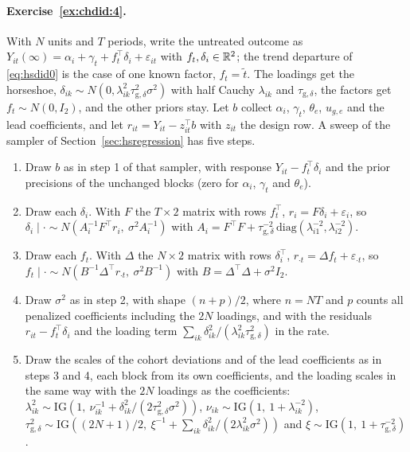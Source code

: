 \paragraph{Exercise~\ref{ex:chdid:4}.} With $N$ units and $T$ periods, write the untreated outcome as $Y_{it}(\infty) = \alpha_i + \gamma_t + f_t^\top\delta_i + \varepsilon_{it}$ with $f_t, \delta_i \in \mathbb{R}^2$; the trend departure of \eqref{eq:hsdid0} is the case of one known factor, $f_t = \tilde t$. The loadings get the horseshoe, $\delta_{ik} \sim N(0, \lambda_{ik}^2\tau_{\mathrm{g},\delta}^2\sigma^2)$ with half Cauchy $\lambda_{ik}$ and $\tau_{\mathrm{g},\delta}$, the factors get $f_t \sim N(0, I_2)$, and the other priors stay. Let $b$ collect $\alpha_i$, $\gamma_t$, $\theta_e$, $u_{g,e}$ and the lead coefficients, and let $r_{it} = Y_{it} - z_{it}^\top b$ with $z_{it}$ the design row. A sweep of the sampler of Section~\ref{sec:hsregression} has five steps.
\begin{enumerate}
\item Draw $b$ as in step 1 of that sampler, with response $Y_{it} - f_t^\top\delta_i$ and the prior precisions of the unchanged blocks (zero for $\alpha_i$, $\gamma_t$ and $\theta_e$).
\item Draw each $\delta_i$. With $F$ the $T \times 2$ matrix with rows $f_t^\top$, $r_i = F\delta_i + \varepsilon_i$, so $\delta_i \mid \cdot \sim N(A_i^{-1}F^\top r_i,\ \sigma^2A_i^{-1})$ with $A_i = F^\top F + \tau_{\mathrm{g},\delta}^{-2}\,\mathrm{diag}(\lambda_{i1}^{-2}, \lambda_{i2}^{-2})$.
\item Draw each $f_t$. With $\Delta$ the $N \times 2$ matrix with rows $\delta_i^\top$, $r_{\cdot t} = \Delta f_t + \varepsilon_{\cdot t}$, so $f_t \mid \cdot \sim N(B^{-1}\Delta^\top r_{\cdot t},\ \sigma^2B^{-1})$ with $B = \Delta^\top\Delta + \sigma^2I_2$.
\item Draw $\sigma^2$ as in step 2, with shape $(n + p)/2$, where $n = NT$ and $p$ counts all penalized coefficients including the $2N$ loadings, and with the residuals $r_{it} - f_t^\top\delta_i$ and the loading term $\sum_{ik}\delta_{ik}^2/(\lambda_{ik}^2\tau_{\mathrm{g},\delta}^2)$ in the rate.
\item Draw the scales of the cohort deviations and of the lead coefficients as in steps 3 and 4, each block from its own coefficients, and the loading scales in the same way with the $2N$ loadings as the coefficients: $\lambda_{ik}^2 \sim \mathrm{IG}(1,\ \nu_{ik}^{-1} + \delta_{ik}^2/(2\tau_{\mathrm{g},\delta}^2\sigma^2))$, $\nu_{ik} \sim \mathrm{IG}(1,\ 1 + \lambda_{ik}^{-2})$, $\tau_{\mathrm{g},\delta}^2 \sim \mathrm{IG}((2N + 1)/2,\ \xi^{-1} + \sum_{ik}\delta_{ik}^2/(2\lambda_{ik}^2\sigma^2))$ and $\xi \sim \mathrm{IG}(1,\ 1 + \tau_{\mathrm{g},\delta}^{-2})$.
\end{enumerate}
